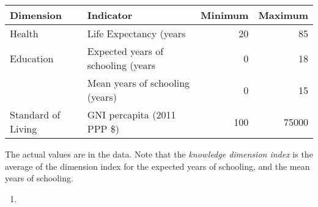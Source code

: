 \documentclass[
]{article}
\providecommand{\tightlist}{%
  \setlength{\itemsep}{0pt}\setlength{\parskip}{0pt}}
\begin{document}
\begin{tabular}{l|l|r|r}
\hline
Dimension & Indicator & Minimum & Maximum\\
\hline
Health & Life Expectancy (years & 20 & 85\\
\hline
Education & Expected years of schooling (years & 0 & 18\\
\hline
 & Mean years of schooling (years) & 0 & 15\\
\hline
Standard of Living & GNI percapita (2011 PPP \$) & 100 & 75000\\
\hline
\end{tabular}

The actual values are in the data. Note that the \emph{knowledge
dimension index} is the average of the dimension index for the expected
years of schooling, and the mean years of schooling.

\begin{enumerate}
\def\labelenumi{\arabic{enumi}.}
\setcounter{enumi}{5}
\tightlist
\item
\end{enumerate}
\end{document}
